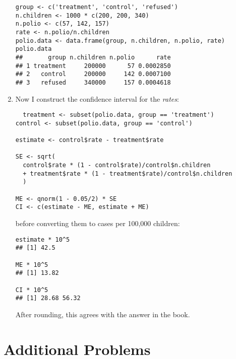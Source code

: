 \documentclass[addpoints,12pt]{exam}
\begin{document}
\begin{questions}
\begin{solution}
\begin{enumerate}
\begin{verbatim}
group <- c('treatment', 'control', 'refused')
n.children <- 1000 * c(200, 200, 340)
n.polio <- c(57, 142, 157)
rate <- n.polio/n.children
polio.data <- data.frame(group, n.children, n.polio, rate)
polio.data
##       group n.children n.polio      rate
## 1 treatment     200000      57 0.0002850
## 2   control     200000     142 0.0007100
## 3   refused     340000     157 0.0004618
\end{verbatim}

  \item Now I construct the confidence interval for the \emph{rates}:
  \begin{verbatim}
  treatment <- subset(polio.data, group == 'treatment')
control <- subset(polio.data, group == 'control')

estimate <- control$rate - treatment$rate

SE <- sqrt( 
  control$rate * (1 - control$rate)/control$n.children
  + treatment$rate * (1 - treatment$rate)/control$n.children
  )

ME <- qnorm(1 - 0.05/2) * SE
CI <- c(estimate - ME, estimate + ME)
  \end{verbatim}

  before converting them to cases per 100,000 children:

\begin{verbatim}
estimate * 10^5
## [1] 42.5

ME * 10^5
## [1] 13.82

CI * 10^5
## [1] 28.68 56.32
\end{verbatim}

  After rounding, this agrees with the answer in the book.
  \end{enumerate}

		\end{solution}
\end{questions}



 \section*{Additional Problems}
\end{document}
